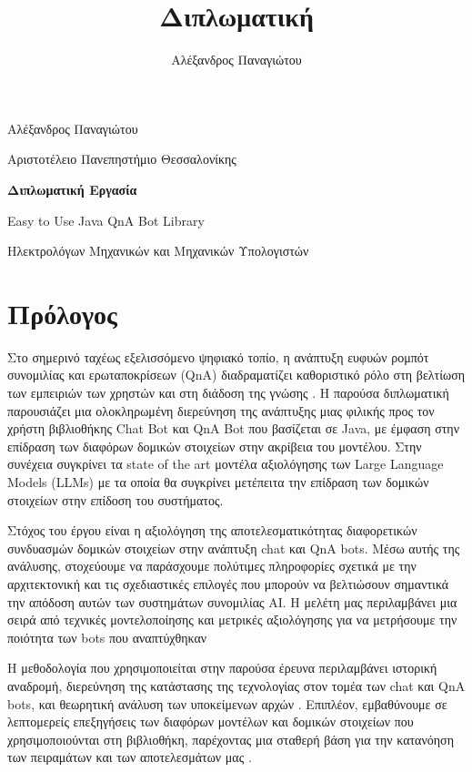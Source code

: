 \documentclass{report}
\title{Διπλωματική}
\author{Αλέξανδρος Παναγιώτου}
\begin{document}
\begin{titlepage}
    \centering
    \vspace*{1cm}
    {\LARGE Αλέξανδρος Παναγιώτου \par}
    \vspace*{0.5cm}
    {\Large Αριστοτέλειο Πανεπηστήμιο Θεσσαλονίκης \par}
    \vspace{2cm}
    {\Huge\bfseries Διπλωματική Εργασία \par}
    \vspace{2cm}
    {\Large Easy to Use Java QnA Bot Library \par}
    \vspace*{1cm}
    {\large Ηλεκτρολόγων Μηχανικών και Μηχανικών Υπολογιστών \par}
    \vspace{2cm}
\end{titlepage}

\tableofcontents 

\chapter*{Πρόλογος}

Στο σημερινό ταχέως εξελισσόμενο ψηφιακό τοπίο, η ανάπτυξη ευφυών ρομπότ συνομιλίας και ερωταποκρίσεων (QnA) διαδραματίζει καθοριστικό ρόλο στη βελτίωση των εμπειριών των χρηστών και στη διάδοση της γνώσης \cite{eliza, parry}. Η παρούσα διπλωματική παρουσιάζει μια ολοκληρωμένη διερεύνηση της ανάπτυξης μιας φιλικής προς τον χρήστη βιβλιοθήκης Chat Bot  και QnA Bot που βασίζεται σε Java, με έμφαση στην επίδραση των διαφόρων δομικών στοιχείων στην ακρίβεια του μοντέλου. Στην συνέχεια συγκρίνει τα state of the art μοντέλα αξιολόγησης των Large Language Models (LLMs) με τα οποία θα συγκρίνει μετέπειτα την επίδραση των δομικών στοιχείων στην επίδοση του συστήματος.

Στόχος του έργου είναι η αξιολόγηση της αποτελεσματικότητας διαφορετικών συνδυασμών δομικών στοιχείων στην ανάπτυξη chat και QnA bots. Μέσω αυτής της ανάλυσης, στοχεύουμε να παράσχουμε πολύτιμες πληροφορίες σχετικά με την αρχιτεκτονική και τις σχεδιαστικές επιλογές που μπορούν να βελτιώσουν σημαντικά την απόδοση αυτών των συστημάτων συνομιλίας AI. Η μελέτη μας περιλαμβάνει μια σειρά από τεχνικές μοντελοποίησης\cite{ada, bert, gpt, roberta} και μετρικές αξιολόγησης για να μετρήσουμε την ποιότητα των bots που αναπτύχθηκαν \cite{squad} 

Η μεθοδολογία που χρησιμοποιείται στην παρούσα έρευνα περιλαμβάνει ιστορική αναδρομή, διερεύνηση της κατάστασης της τεχνολογίας στον τομέα των chat και QnA bots, και θεωρητική ανάλυση των υποκείμενων αρχών \cite{book}. Επιπλέον, εμβαθύνουμε σε λεπτομερείς επεξηγήσεις των διαφόρων μοντέλων και δομικών στοιχείων που χρησιμοποιούνται στη βιβλιοθήκη, παρέχοντας μια σταθερή βάση για την κατανόηση των πειραμάτων και των αποτελεσμάτων μας \cite{xiaoice, duplex}.
\end{document}
